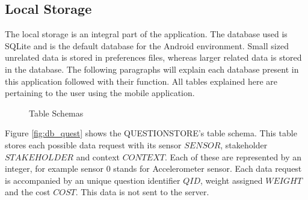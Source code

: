 \subsection{Local Storage}
The local storage is an integral part of the application. The database used is SQLite and is the default database
for the Android environment. Small sized unrelated data is stored in preferences files, whereas larger related
data is stored in the database. The following paragraphs will explain each database present in this application followed with 
their function. All tables explained here are pertaining to the user using the mobile application.

\begin{figure}[htp]
\hspace{1em}
\caption{Table Schemas}
\label{fig:ts1}
\end{figure}


Figure \ref{fig:db_quest} shows the QUESTIONSTORE's table schema. This table stores each possible data request with its sensor $SENSOR$, stakeholder  $STAKEHOLDER$ and context $CONTEXT$. Each of these are represented by an integer, for example sensor 0 stands for Accelerometer sensor. Each data request is accompanied by
an unique question identifier $QID$, weight assigned $WEIGHT$ and the cost $COST$. This data is not sent to 
the server.

